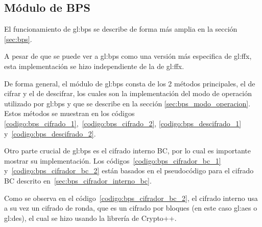 %
%
%

%
\subsection{Módulo de BPS}

El funcionamiento de \gls{gl:bps} se describe de forma más amplia en la sección
\ref{sec:bps}.


A pesar de que se puede ver a \gls{gl:bps} como una versión más especifica de
\gls{gl:ffx}, esta implementación se hizo independiente de la de \gls{gl:ffx}.

De forma general, el módulo de \gls{gl:bps} consta de los 2 métodos principales,
el de cifrar y el de descifrar, los cuales son la implementación del modo de
operación utilizado por \gls{gl:bps} y que se describe en la sección
\ref{sec:bps_modo_operacion}. Estos métodos se muestran en los códigos
\ref{codigo:bps_cifrado_1},~\ref{codigo:bps_cifrado_2},
\ref{codigo:bps_descifrado_1} y~\ref{codigo:bps_descifrado_2}.





Otro parte crucial de \gls{gl:bps} es el cifrado interno BC, por lo cual es
importante mostrar su implementación. Los códigos~\ref{codigo:bps_cifrador_bc_1}
y~\ref{codigo:bps_cifrador_bc_2} están basados en el pseudocódigo para el
cifrado BC descrito en~\ref{sec:bps_cifrador_interno_bc}.



Como se observa en el código~\ref{codigo:bps_cifrador_bc_2}, el cifrado
interno usa a su vez un cifrado de ronda, que es un cifrado por bloques
(en este caso \gls{gl:aes} o \gls{gl:des}), el cual se hizo usando la
librería de Crypto++.
